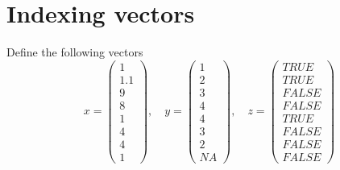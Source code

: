 \documentclass{article}
\begin{document}
\section{Indexing vectors}

Define the following vectors%
\begin{equation*}
x=\left( 
\begin{array}{c}
1 \\ 
1.1 \\ 
9 \\ 
8 \\ 
1 \\ 
4 \\ 
4 \\ 
1%
\end{array}%
\right) ,\quad y=\left( 
\begin{array}{c}
1 \\ 
2 \\ 
3 \\ 
4 \\ 
4 \\ 
3 \\ 
2 \\ 
NA%
\end{array}%
\right) ,\quad z=\left( 
\begin{array}{c}
TRUE \\ 
TRUE \\ 
FALSE \\ 
FALSE \\ 
TRUE \\ 
FALSE \\ 
FALSE \\ 
FALSE%
\end{array}%
\right)
\end{equation*}
\end{document}
